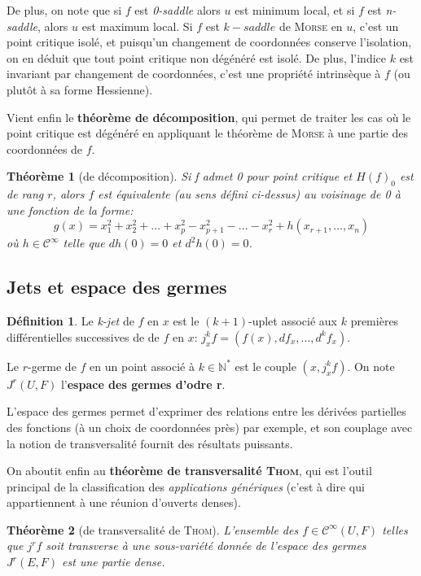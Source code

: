 \documentclass[a4paper]{article}
\newcommand{\cinf}{\mathcal{C}^\infty}
\newcommand{\N}{\mathbb{N}}
\newtheorem{thm}{Théorème}
\theoremstyle{definition}
\newtheorem{defn}{Définition}
\begin{document}
De plus, on note que si $f$ est \textit{0-saddle} alors $u$ est minimum local, et si $f$ est \textit{n-saddle}, alors $u$ est maximum local.
Si $f$ est $k-saddle$ de \textsc{Morse} en $u$, c'est un point critique isolé, et puisqu'un changement de coordonnées conserve l'isolation, on en déduit que tout point critique non dégénéré est isolé.
De plus, l'indice $k$ est invariant par changement de coordonnées, c'est une propriété intrinsèque à $f$ (ou plutôt à sa forme Hessienne).

Vient enfin le \textbf{théorème de décomposition}, qui permet de traiter les cas où le point critique est dégénéré en appliquant le théorème de \textsc{Morse} à une partie des coordonnées de $f$.
\begin{thm}[de décomposition]
	Si f admet 0 pour point critique et $H(f)_0$ est de rang $r$, alors $f$ est équivalente (au sens défini ci-dessus) au voisinage de 0 à une fonction de la forme:
	$$g(x)= x_1^2+x_2^2+ ...+x_p^2-x_{p+1}^2 -...- x_r^2 + h(x_{r+1},...,x_n)$$
	où $h\in\cinf$ telle que $dh(0)=0$ et $d^2h(0)=0$.
\end{thm}

\subsection{Jets et espace des germes}
\begin{defn}
	Le \textit{k-jet} de $f$ en $x$ est le $(k+1)$-uplet associé aux $k$ premières différentielles successives de de $f$ en $x$: $j^k_x f = \left(f(x), df_x, ..., d^kf_x\right)$.

	Le $r$-germe de $f$ en un point associé à $k\in\N^*$ est le couple $(x,j^k_x f)$. On note $J^r(U,F)$ l'\textbf{espace des germes d'odre r}.
\end{defn}

L'espace des germes permet d'exprimer des relations entre les dérivées partielles des fonctions (à un choix de coordonnées près) par exemple, et son couplage avec la notion de transversalité fournit des résultats puissants.

On aboutit enfin au \textbf{théorème de transversalité \textsc{Thom}}, qui est l'outil principal de la classification des \textit{applications génériques} (c'est à dire qui appartiennent à une réunion d'ouverts denses).
\begin{thm}[de transversalité de \textsc{Thom}]
	L'ensemble des $f\in\cinf(U,F)$ telles que $j^rf$ soit transverse à une sous-variété donnée de l'espace des germes $J^r(E,F)$ est une partie dense.
\end{thm}
\end{document}
